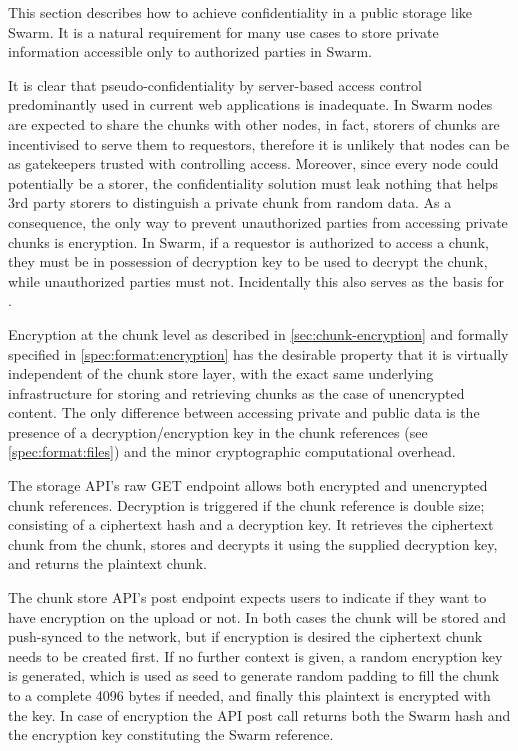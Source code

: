 This section describes how to achieve confidentiality in a  public storage like Swarm. 
It is a natural requirement for many use cases to store private information accessible only to authorized parties in Swarm. 

It is clear that pseudo-confidentiality by server-based access control predominantly used in current web applications is inadequate. In Swarm nodes are expected to share the chunks with other nodes, in fact, storers of chunks are incentivised to serve them to requestors, therefore it is unlikely that nodes can be as gatekeepers trusted with controlling access. Moreover, since every node could potentially be a storer, the confidentiality solution must leak nothing that helps 3rd party storers to distinguish a private chunk from random data. As a consequence, the only way to prevent unauthorized parties from accessing private chunks is encryption. In Swarm, if a requestor is authorized to access a chunk, they must be in possession of decryption key to be used to decrypt the chunk, while unauthorized parties must not. Incidentally this also serves as the basis for .

Encryption at the chunk level as described in \ref{sec:chunk-encryption} and formally specified in \ref{spec:format:encryption}
has the desirable property that it is virtually independent of the chunk store layer, with the exact same underlying infrastructure for storing and retrieving chunks as the case of unencrypted content.
The only difference between accessing private and public data is the presence of a decryption/encryption key in the chunk references (see \ref{spec:format:files}) and the minor cryptographic computational overhead.


The storage API's raw GET endpoint allows both encrypted and unencrypted chunk references. 
Decryption is triggered if the chunk reference is double size; consisting of a ciphertext hash and a decryption key.  It retrieves the ciphertext chunk from the chunk, stores and decrypts it using the supplied decryption key, and returns the plaintext chunk.

The chunk store API's post endpoint expects users to indicate if they want to have encryption on the upload or not. In both cases the chunk will be stored and push-synced to the network, but if encryption is desired the ciphertext chunk needs to be created first. If no further context is given, a random encryption key is generated, which is used as seed to generate random padding to fill the chunk to a complete 4096 bytes if needed, and finally this plaintext is encrypted with the key. In case of encryption the API post call returns both the Swarm hash and the encryption key constituting the Swarm reference. 

